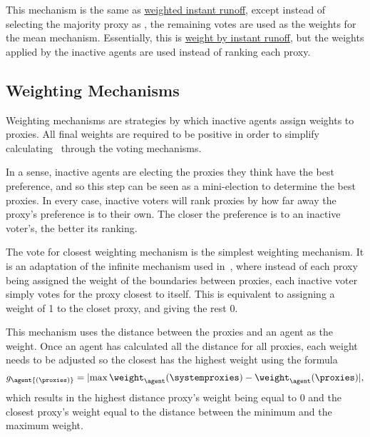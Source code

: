 \label{para:avg-weighted-instant-runoff}
This mechanism is the same as
\hyperref[para:candidate-weighted-instant-runoff]{weighted instant runoff},
except instead of selecting the majority proxy as \systemtruth, the remaining votes
are used as the weights for the mean mechanism.
Essentially, this is
\hyperref[para:avg-instant-runoff]{weight by instant runoff}, but the weights
applied by the inactive agents are used instead of ranking each proxy.

\subsection{Weighting Mechanisms}\label{subsec:weighting-mechanisms}
Weighting mechanisms are strategies by which inactive agents assign weights
to proxies.
All final weights are required to be positive in order to simplify
calculating \systemtruth\ through the voting mechanisms.

In a sense, inactive agents are electing the proxies they think have the best
preference, and so this step can be seen as a mini-election to determine the best
proxies.
In every case, inactive voters will rank proxies by how far away the proxy's
preference is to their own.
The closer the preference is to an inactive voter's, the better its ranking.

\label{para:closest}
The vote for closest weighting mechanism is the simplest weighting mechanism.
It is an adaptation of the infinite mechanism used in~\cite{Cohensius2017},
where instead of each proxy being assigned the weight of the boundaries
between proxies, each inactive voter simply votes for the proxy closest to
itself.
This is equivalent to assigning a weight of 1 to the closet proxy, and giving
the rest 0.

\label{para:distance-voting}
This mechanism uses the distance between the proxies and an agent as the weight.
Once an agent has calculated all the distance for all proxies,
each weight needs to be adjusted so the closest has the highest weight using
the formula
\begin{equation}
    g_\agent{(\proxies)} = \lvert
    \max{\weight_{\agent}{(\systemproxies)}} - \weight_{\agent}{(\proxies)}
    \rvert
    \text{,}\label{eq:distance-voting-adjustment}
\end{equation}
which results in the highest distance proxy's weight being equal to 0 and the
closest proxy's weight equal to the distance between the minimum and the
maximum weight.

